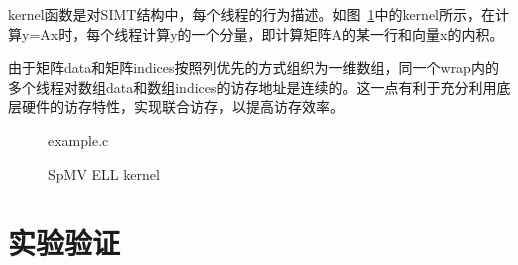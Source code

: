 \documentclass[11pt,twocolumn]{article}
\begin{document}
kernel函数是对SIMT结构中，每个线程的行为描述。如图~\ref{fig:ell_kernel}中的kernel所示，在计算y=Ax时，每个线程计算y的一个分量，即计算矩阵A的某一行和向量x的内积。

由于矩阵data和矩阵indices按照列优先的方式组织为一维数组，同一个wrap内的多个线程对数组data和数组indices的访存地址是连续的。这一点有利于充分利用底层硬件的访存特性，实现联合访存，以提高访存效率。

\begin{figure} 
  \centering 
	
	{example.c}
	\caption{SpMV ELL kernel} 
  	\label{fig:ell_kernel} %
\end{figure}

\section{实验验证}
\end{document}
